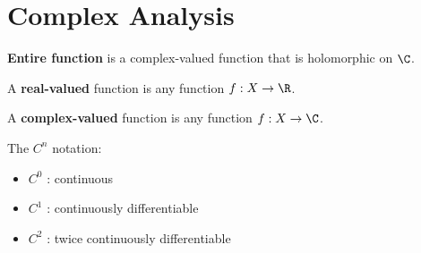 
\section{Complex Analysis}\label{f28d4dc}


\textbf{Entire function} is a complex-valued function that is
holomorphic on $\C$.

A \textbf{real-valued} function is any function $f:X\to\R$.

A \textbf{complex-valued} function is any function $f:X\to\C$.

The $C^n$ notation:
\begin{itemize}
	\item $C^0$ : continuous
	\item $C^1$ : continuously differentiable
	\item $C^2$ : twice continuously differentiable
\end{itemize}
